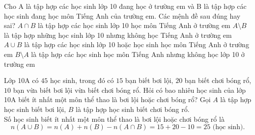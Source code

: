 \begin{ex}%
 Cho A là tập hợp các học sinh lớp 10 đang học ở trường em và B là tập hợp các học sinh đang học môn Tiếng Anh của trường em. Các mệnh đề sau đúng hay sai?
	\choiceTF
	{\True $A\cap B$ là tập hợp các học sinh lớp 10 học môn Tiếng Anh ở trường em}
	{\True $A\setminus B$ là tập hợp những học sinh lớp 10 nhưng không học Tiếng Anh ở trường em}
	{\True $A\cup B$ là tập hợp các học sinh lớp 10 hoặc học sinh học môn Tiếng Anh ở trường em}
	{\True $B\setminus A$ là tập hợp các học sinh học môn Tiếng Anh nhưng không học lớp 10 ở trường em}
\end{ex}

\begin{bt}%
	Lớp 10A có $45$ học sinh, trong đó có $15$ bạn biết bơi lội, $20$ bạn biết chơi bóng rổ, $10$ bạn vừa biết bơi lội vừa biết chơi bóng rổ. Hỏi có bao nhiêu học sinh của lớp 10A biết ít nhất một môn thể thao là bơi lội hoặc chơi bóng rổ?
	\loigiai
	{
		Gọi $A$ là tập hợp học sinh biết bơi lội, $B$ là tập hợp học sinh biết chơi bóng rổ.\\
		Số học sinh biết ít nhất một môn thể thao là bơi lội hoặc chơi bóng rổ là
		\[n(A\cup B)=n(A)+n(B)-n(A\cap B)=15+20-10=25\text{ (học sinh)}. \]
	}
\end{bt}

